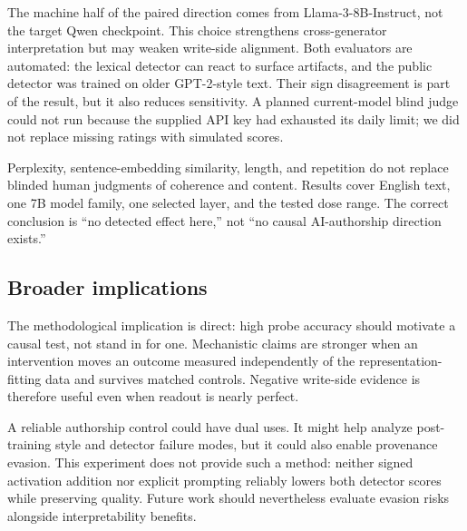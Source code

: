  The machine half of the paired direction comes from Llama-3-8B-Instruct, not the target Qwen checkpoint. This choice strengthens cross-generator interpretation but may weaken write-side alignment. Both evaluators are automated: the lexical detector can react to surface artifacts, and the public \publicdet detector was trained on older GPT-2-style text. Their sign disagreement is part of the result, but it also reduces sensitivity. A planned current-model blind judge could not run because the supplied API key had exhausted its daily limit; we did not replace missing ratings with simulated scores.

 Perplexity, sentence-embedding similarity, length, and repetition do not replace blinded human judgments of coherence and content. Results cover English \hape text, one 7B model family, one selected layer, and the tested dose range. The correct conclusion is ``no detected effect here,'' not ``no causal AI-authorship direction exists.''

\subsection{Broader implications}

The methodological implication is direct: high probe accuracy should motivate a causal test, not stand in for one. Mechanistic claims are stronger when an intervention moves an outcome measured independently of the representation-fitting data and survives matched controls. Negative write-side evidence is therefore useful even when readout is nearly perfect.

A reliable authorship control could have dual uses. It might help analyze post-training style and detector failure modes, but it could also enable provenance evasion. This experiment does not provide such a method: neither signed activation addition nor explicit prompting reliably lowers both detector scores while preserving quality. Future work should nevertheless evaluate evasion risks alongside interpretability benefits.

